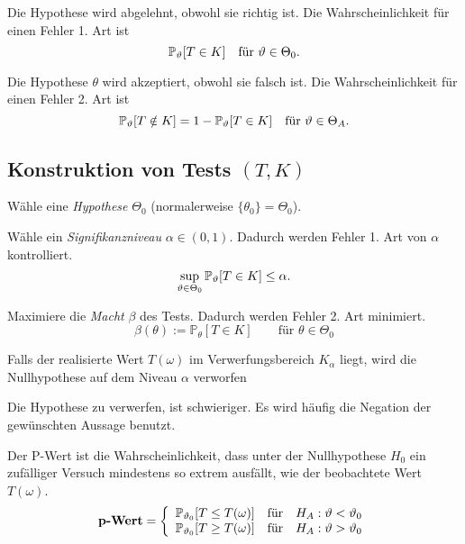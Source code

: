 \begin{definition} Die Hypothese wird abgelehnt, obwohl sie richtig ist.
	Die Wahrscheinlichkeit für einen Fehler 1. Art ist
	\[
		\P_\theta[T \in K]
		\quad\text{für } \theta \in \Theta_0.
	\]
\end{definition}

\begin{definition}
	Die Hypothese \(\theta\) wird akzeptiert, obwohl sie falsch ist.
	Die Wahrscheinlichkeit für einen Fehler 2. Art ist
	\[
		\P_\theta[T \notin K] =
		1 - \P_\theta[T \in K]
		\quad\text{für } \theta \in \Theta_A.
	\]
\end{definition}




\subsection{Konstruktion von Tests \((T,K)\)}

\begin{compactenum}
	\item
	Wähle eine \emph{Hypothese} \(\Theta_0\) (normalerweise \(\{\theta_0\} = \Theta_0\)).

	\item
	Wähle ein \emph{Signifikanzniveau} \(\alpha \in (0,1)\).
	Dadurch werden Fehler 1. Art von \(\alpha\) kontrolliert.
	\[	\sup_{\theta \in \Theta_0} \P_\theta[T \in K] \leq \alpha.	\]

	\item
	Maximiere die \emph{Macht} \(\beta\) des Tests.
	Dadurch werden Fehler 2. Art minimiert.
	\[ \beta(\theta) := \mathbb{P}_\theta[T \in K] \qquad \text{für } \theta \in \Theta_0 \]

	\item
	Falls der realisierte Wert \(T(\omega)\) im Verwerfungsbereich \(K_\alpha\) liegt,
	wird die Nullhypothese auf dem Niveau \(\alpha\) verworfen
\end{compactenum}

\begin{note}
	Die Hypothese zu verwerfen, ist schwieriger. Es
	wird häufig die Negation der gewünschten Aussage benutzt.
\end{note}

\begin{definition}[P-Wert]
	Der P-Wert ist die Wahrscheinlichkeit, dass unter der Nullhypothese \(H_0\) ein zufälliger Versuch
	mindestens so extrem ausfällt, wie der beobachtete Wert \(T(\omega)\).
	\[
		\textbf{p-Wert} =
		\left\{\begin{array}{cl}
			\P_{\theta_0}[T \leq T(\omega)] & \text{für\quad} H_A: \theta < \theta_0 \\
			\P_{\theta_0}[T \geq T(\omega)] & \text{für\quad} H_A: \theta > \theta_0
		\end{array}\right.
	\]
\end{definition}



